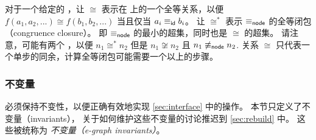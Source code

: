\begin{definition}[同余，Congruence] 
  对于一个给定的 \egraph ，让 $\cong$ 表示在 \enodes 上的一个全等关系，以便
  ${f(a_{1}, a_{2}, ...) \cong f(b_{1}, b_{2}, ...)}$ 当且仅当 $a_{i} \equiv_{\sf id} b_{i}$。
  让 $\cong^{*}$ 表示 $\equiv_{\sf node}$ 的全等闭包（congruence closure）。
   即 $\equiv_{\sf node}$ 的最小的超集，同时也是 $\cong$ 的超集。
  请注意，可能有两个 \enodes ，以便
    $n_{1} \cong^{*} n_{2}$ 但是
    $n_{1} \not\cong n_{2}$ 且
    $n_{1} \not\equiv_{\sf node} n_{2}$.
  关系 $\cong$ 只代表一个单步的同余，计算全等闭包可能需要一个以上的步骤。
  
\end{definition}

\subsubsection{\Egraph 不变量}
\label{sec:invariants}

\egraph 必须保持不变性，以便正确有效地实现 \autoref{sec:interface} 中的操作。
本节只定义了不变量（invariants），
  关于如何维护这些不变量的讨论推迟到 \autoref{sec:rebuild} 中。
这些被统称为 \textit{\Egraph 不变量（e-graph invariants）}。

